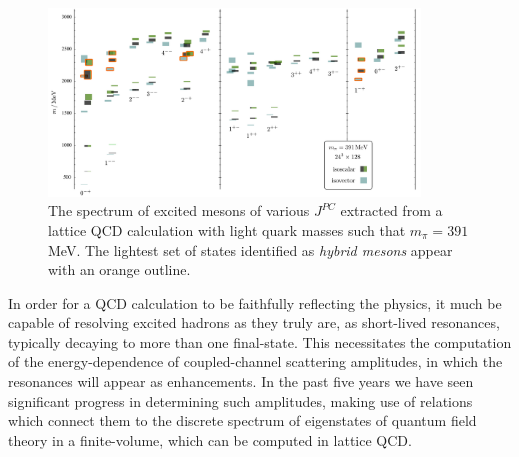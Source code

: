 \begin{figure}
\includegraphics[width=0.88\textwidth]{figures/isoscalar}
\caption{The spectrum of excited mesons of various $J^{PC}$ extracted from a lattice QCD calculation with light quark masses such that $m_\pi = 391$ MeV. The lightest set of states identified as \emph{hybrid mesons} appear with an orange outline.}
\label{spectrum}
\end{figure}

In order for a QCD calculation to be faithfully reflecting the physics, it much be capable of resolving excited hadrons as they truly are, as short-lived resonances, typically decaying to more than one final-state. This necessitates the computation of the energy-dependence of coupled-channel scattering amplitudes, in which the resonances will appear as enhancements. In the past five years we have seen significant progress in determining such amplitudes, making use of relations which connect them to the discrete spectrum of eigenstates of quantum field theory in a finite-volume, which can be computed in lattice QCD.

